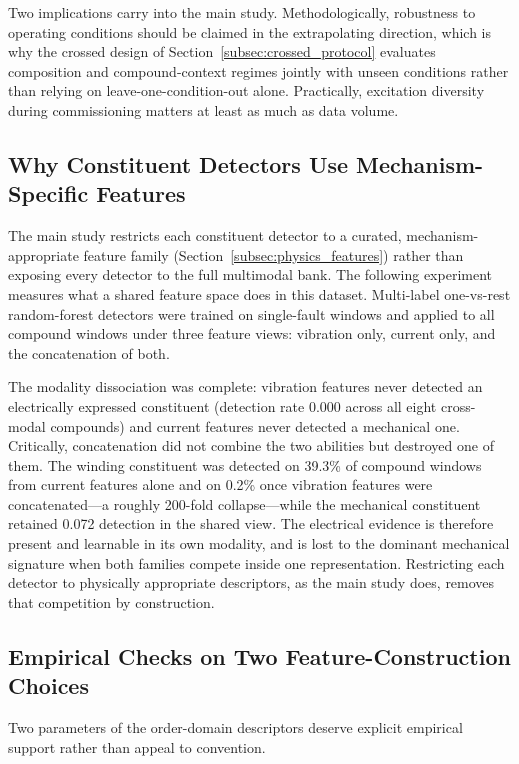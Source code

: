 Two implications carry into the main study. Methodologically, robustness to
operating conditions should be claimed in the extrapolating direction, which
is why the crossed design of Section~\ref{subsec:crossed_protocol} evaluates
composition and compound-context regimes jointly with unseen conditions rather
than relying on leave-one-condition-out alone. Practically, excitation
diversity during commissioning matters at least as much as data volume.

\subsection{Why Constituent Detectors Use Mechanism-Specific Features}
\label{app:modality}

The main study restricts each constituent detector to a curated,
mechanism-appropriate feature family (Section~\ref{subsec:physics_features})
rather than exposing every detector to the full multimodal bank. The
following experiment measures what a shared feature space does in this
dataset. Multi-label one-vs-rest random-forest detectors were trained on
single-fault windows and applied to all compound windows under three feature
views: vibration only, current only, and the concatenation of both.

The modality dissociation was complete: vibration features never detected an
electrically expressed constituent (detection rate 0.000 across all eight
cross-modal compounds) and current features never detected a mechanical one.
Critically, concatenation did not combine the two abilities but destroyed one
of them. The winding constituent was detected on 39.3\% of compound windows
from current features alone and on 0.2\% once vibration features were
concatenated---a roughly 200-fold collapse---while the mechanical constituent
retained 0.072 detection in the shared view. The electrical evidence is
therefore present and learnable in its own modality, and is lost to the
dominant mechanical signature when both families compete inside one
representation. Restricting each detector to physically appropriate
descriptors, as the main study does, removes that competition by
construction.

\subsection{Empirical Checks on Two Feature-Construction Choices}
\label{app:featurephysics}

Two parameters of the order-domain descriptors deserve explicit empirical
support rather than appeal to convention.

